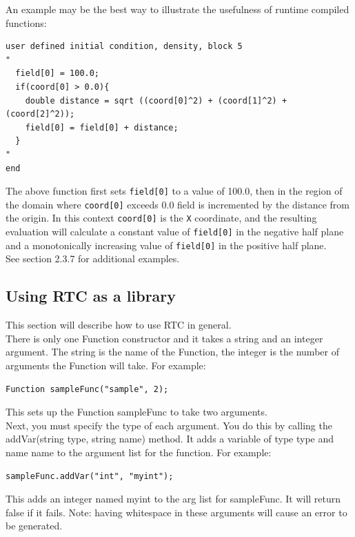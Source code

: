 \documentclass{article}
\begin{document}
\noindent
An example may be the best way to illustrate the usefulness of runtime
compiled functions:

{\ttfamily \begin{verbatim}
user defined initial condition, density, block 5
" 
  field[0] = 100.0;
  if(coord[0] > 0.0){
    double distance = sqrt ((coord[0]^2) + (coord[1]^2) + (coord[2]^2));
    field[0] = field[0] + distance;
  }
"
end
\end{verbatim} }
\noindent
The above function first sets \texttt{field[0]} to a value of 100.0, then in 
the region of the domain where \texttt{coord[0]} exceeds 0.0 field is 
incremented by the distance from the origin. In this context \texttt{coord[0]} 
is the \texttt{X} coordinate, and the resulting evaluation will calculate a
constant value of \texttt{field[0]} in the negative half plane and a
monotonically increasing value of \texttt{field[0]} in the positive half plane.\\

\noindent
See section 2.3.7 for additional examples. 

\subsection{Using RTC as a library}

This section will describe how to use RTC in general. \\

\noindent
There is only one Function constructor and it takes a string and an integer 
argument. The string is the name of the Function, the integer is the number of
arguments the Function will take. For example:
{\ttfamily \begin{verbatim}
Function sampleFunc("sample", 2);
\end{verbatim} }
\noindent
This sets up the Function sampleFunc to take two arguments.\\

\noindent
Next, you must specify the type of each argument. You do this by calling the
addVar(string type, string name) method. It adds a variable of type type and
name name to the argument list for the function. For example:
{\ttfamily \begin{verbatim}
sampleFunc.addVar("int", "myint");
\end{verbatim} }
\noindent
This adds an integer named myint to the arg list for sampleFunc. It will return
false if it fails. Note: having whitespace in these arguments will cause an 
error to be generated. \\
\end{document}
